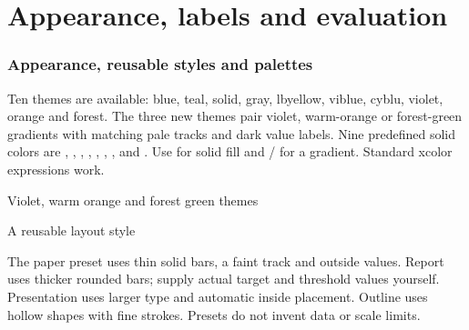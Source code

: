 \part{Appearance, labels and evaluation}

\section{Appearance, reusable styles and palettes}
Ten themes are available: blue, teal, solid, gray, lbyellow, viblue, cyblu,
violet, orange and forest. The three new themes pair violet, warm-orange or
forest-green gradients with matching pale tracks and dark value labels.
Nine predefined solid colors are , ,
, , ,
, ,  and
. Use  for solid fill and
/ for a gradient. Standard xcolor expressions work.

\begin{demo}{Violet, warm orange and forest green themes}


\end{demo}

\begin{demo}{A reusable layout style}




\end{demo}
The paper preset uses thin solid bars, a faint track and outside values. Report
uses thicker rounded bars; supply actual target and threshold values yourself.
Presentation uses larger type and automatic inside placement. Outline uses hollow
shapes with fine strokes. Presets do not invent data or scale limits.


